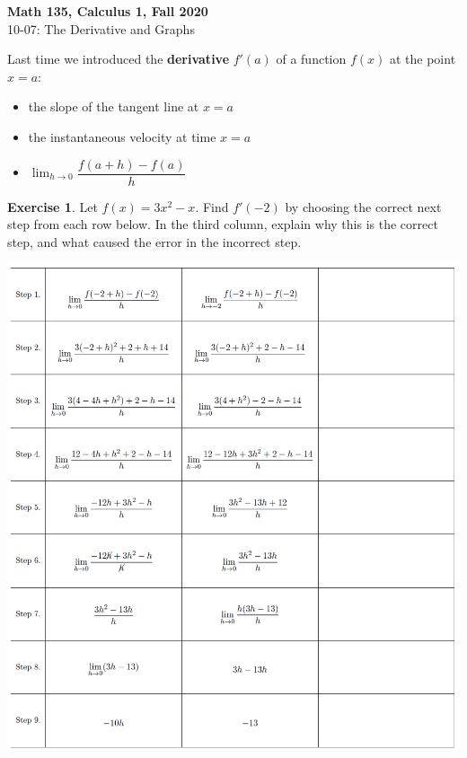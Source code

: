 \documentclass[11pt,reqno,final]{amsart}
\numberwithin{figure}{section}
\theoremstyle{definition} %
\newtheorem{exercise}[question]{Exercise}
\newcommand{\dlim}{\displaystyle\lim}
\begin{document}


\begin{center}
        \textbf{\Large Math 135, Calculus 1, Fall 2020}\\[10pt]
        {\large 10-07: The Derivative and Graphs}
\end{center}

\thispagestyle{empty}


\renewcommand{\thesection}{\Alph{section}}


Last time we introduced the \textbf{derivative} $f'(a)$ of a function $f(x)$ at the point $x=a$:
\begin{itemize}
\item the slope of the tangent line at $x=a$
\item the instantaneous velocity at time $x = a$
\item $\dlim_{h \to 0}\dfrac{f(a+h) - f(a)}{h}$
\end{itemize}

\begin{exercise}
        Let $f(x) = 3x^2 - x$.
        Find $f'(-2)$ by choosing the correct next step from each row below.
        In the third column, explain why this is the correct step, and what caused the error in the incorrect step.

        \includegraphics[width=1.1\textwidth]{10-07P_e1.png}
\end{exercise}
\end{document}
